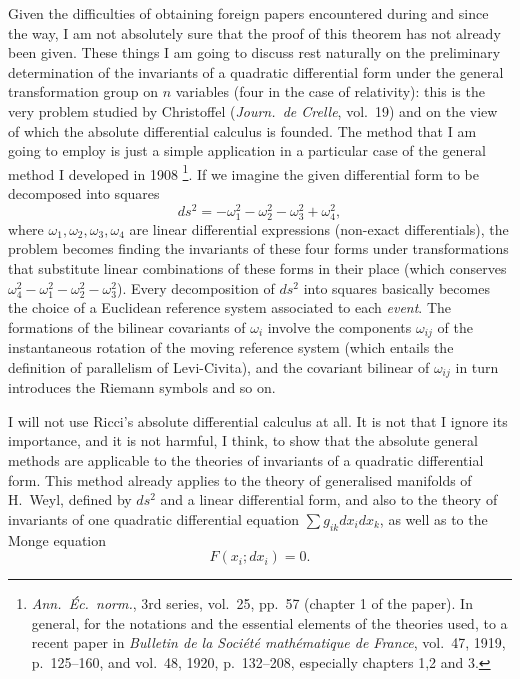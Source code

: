 \documentclass[leqno,12pt]{article}
\theoremstyle{shape1}
\theoremstyle{shape0}
\theoremstyle{shape2}
\theoremstyle{definition}
\begin{document}
Given the difficulties of obtaining foreign papers encountered during and since the way, I am not absolutely sure that the proof of this theorem has not already been given. These things I am going to discuss rest naturally on the preliminary determination of the invariants of a quadratic differential form under the general transformation group on $n$ variables (four in the case of relativity): this is the very problem studied by Christoffel (\emph{Journ.\ de Crelle}, vol.\ 19) and on the view of which the absolute differential calculus is founded. The method that I am going to employ is just a simple application in a particular case of the general method I developed in 1908 \footnote{\emph{Ann.\ Éc.\ norm.}, 3rd series, vol.\ 25, pp.\ 57 (chapter 1 of the paper). In general, for the notations and the essential elements of the theories used, to a recent paper in \emph{Bulletin de la Société mathématique de France}, vol.\ 47, 1919, p.\ 125--160, and vol.\ 48, 1920, p.\ 132--208, especially chapters 1,2 and 3.}. If we imagine the given differential form to be decomposed into squares
\[
ds^{2}=-\omega^{2}_{1}-\omega^{2}_{2}-\omega^{2}_{3}+\omega^{2}_{4},
\] 
where $\omega_{1},\omega_{2},\omega_{3},\omega_{4}$ are linear differential expressions (non-exact differentials), the problem becomes finding the invariants of these four forms under transformations that substitute linear combinations of these forms in their place (which conserves $\omega^{2}_{4}-\omega^{2}_{1}-\omega^{2}_{2}-\omega^{2}_{3}$). Every decomposition of $ds^{2}$ into squares basically becomes the choice of a Euclidean reference system associated to each \emph{event}. The formations of the bilinear covariants of $\omega_{i}$ involve the components $\omega_{ij}$ of the instantaneous rotation of the moving reference system (which entails the definition of parallelism of Levi-Civita), and the covariant bilinear of $\omega_{ij}$ in turn introduces the Riemann symbols and so on.

I will not use Ricci's absolute differential calculus at all. It is not that I ignore its importance, and it is not harmful, I think, to show that the absolute general methods are applicable to the theories of invariants of a quadratic differential form. This method already applies to the theory of generalised manifolds of H.~Weyl, defined by $ds^{2}$ and a linear differential form, and also to the theory of invariants of one quadratic differential equation $\sum g_{ik}dx_{i}dx_{k}$, as well as to the Monge equation
\[
F(x_{i};dx_{i})=0.
\]
\end{document}
